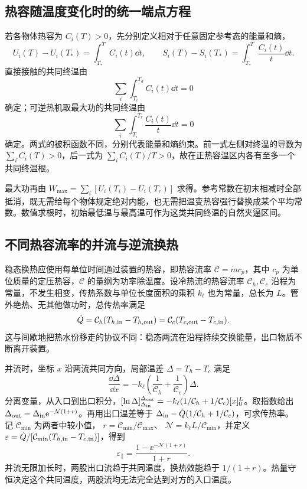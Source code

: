 \subsection{热容随温度变化时的统一端点方程}
若各物体热容为 $C_i(T)>0$，先分别定义相对于任意固定参考态的能量和熵，
\[
 U_i(T)-U_i(T_\ast)=\int_{T_\ast}^{T}C_i(t)\dd t,
 \qquad
 S_i(T)-S_i(T_\ast)=\int_{T_\ast}^{T}\frac{C_i(t)}t\dd t.
\]
直接接触的共同终温由
\[
 \sum_i\int_{T_i}^{T_d}C_i(t)\dd t=0
\]
确定；可逆热机取最大功的共同终温由
\[
 \sum_i\int_{T_i}^{T_r}\frac{C_i(t)}t\dd t=0
\]
确定。两式的被积函数不同，分别代表能量和熵约束。前一式左侧对终温的导数为 $\sum_iC_i(T)>0$，后一式为 $\sum_iC_i(T)/T>0$，故在正热容温区内各有至多一个共同终温根。

最大功再由
$W_{\max}=\sum_i[U_i(T_i)-U_i(T_r)]$ 求得。参考常数在初末相减时全部抵消，既无需给每个物体规定绝对内能，也无需把温变热容强行替换成某个平均常数。数值求根时，初始最低温与最高温可作为这类共同终温的自然夹逼区间。

\subsection{不同热容流率的并流与逆流换热}
\label{th:unequalexchanger}
稳态换热应使用每单位时间通过装置的热容，即热容流率
$\mathcal C=\dot m c_p$，其中 $c_p$ 为单位质量的定压热容，$\mathcal C$ 的量纲为功率除温度。设冷热流的热容流率 $\mathcal C_h,\mathcal C_c$ 沿程为常量，不发生相变，传热系数与单位长度面积的乘积 $k_\ell$ 也为常量，总长为 $L$。管外绝热、无其他做功时，总传热率满足
\[
 \dot Q=\mathcal C_h(T_{h,\rm in}-T_{h,\rm out})
 =\mathcal C_c(T_{c,\rm out}-T_{c,\rm in}).
\]
这与间歇地把热水份移走的协议不同：稳态两流在沿程持续交换能量，出口物质不断离开装置。

并流时，坐标 $x$ 沿两流共同方向，局部温差
$\Delta=T_h-T_c$ 满足
\[
 \frac{\dd\Delta}{\dd x}
 =-k_\ell\left(\frac1{\mathcal C_h}+\frac1{\mathcal C_c}\right)\Delta.
\]
分离变量，从入口到出口积分，$[\ln\Delta]_{\Delta_{\rm in}}^{\Delta_{\rm out}}=-k_\ell(1/\mathcal C_h+1/\mathcal C_c)[x]_0^L$。取指数给出$\Delta_{\rm out}=\Delta_{\rm in}\mathrm e^{-\mathcal N(1+r)}$。再用出口温差等于
$\Delta_{\rm in}-\dot Q(1/\mathcal C_h+1/\mathcal C_c)$，可求传热率。
记 $\mathcal C_{\min}$ 为两者中较小值，
$r=\mathcal C_{\min}/\mathcal C_{\max}$、
$\mathcal N=k_\ell L/\mathcal C_{\min}$，并定义
$\varepsilon=\dot Q/[\mathcal C_{\min}(T_{h,\rm in}-T_{c,\rm in})]$，得到
\[
 \varepsilon_{\parallel}
 =\frac{1-\ee^{-\mathcal N(1+r)}}{1+r}.
\]
并流无限加长时，两股出口流趋于共同温度，换热效能趋于 $1/(1+r)$。热量守恒决定这个共同温度，两股流均无法完全达到对方的入口温度。

